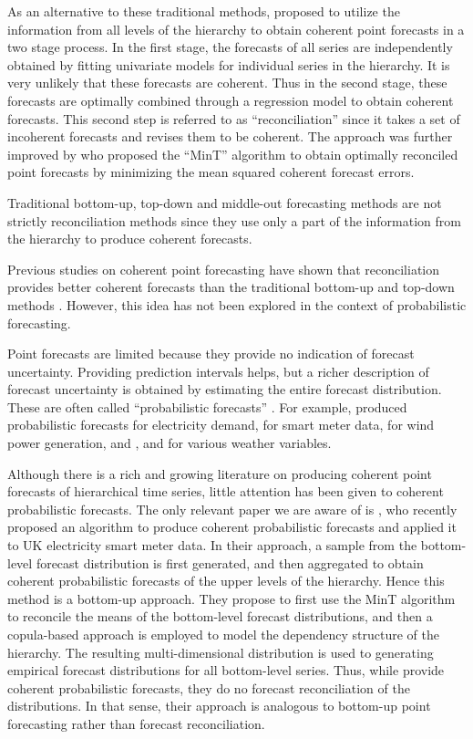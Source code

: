 \documentclass[a4paper, 11pt]{article}
\begin{document}
As an alternative to these traditional methods, \citet{Hyndman2011} proposed to utilize the information from all levels of the hierarchy to obtain coherent point forecasts in  a two stage process. In the first stage, the forecasts of all series are independently obtained by fitting univariate models for individual series in the hierarchy. It is very unlikely that these forecasts are coherent. Thus in the second stage, these forecasts are optimally combined through a regression model to obtain coherent forecasts. This second step is referred to as ``reconciliation'' since it takes a set of incoherent forecasts and revises them to be coherent. The approach was further improved by \citet{Wickramasuriya2017} who proposed the ``MinT'' algorithm to obtain optimally reconciled point forecasts by minimizing the mean squared coherent forecast errors. 

Traditional bottom-up, top-down and middle-out forecasting methods are not strictly reconciliation methods since they use only a part of the information from the hierarchy to produce coherent forecasts. 

Previous studies on coherent point forecasting have shown that reconciliation provides better coherent forecasts than the traditional bottom-up and top-down methods \citep{Hyndman2011,VanErven2015a,Wickramasuriya2017}. However, this idea has not been explored in the context of probabilistic forecasting. 

Point forecasts are limited because they provide no indication of forecast uncertainty. Providing prediction intervals helps, but a richer description of forecast uncertainty is obtained by estimating the entire forecast distribution. These are often called ``probabilistic forecasts'' \citep{Gneiting2014}. For example, \citet{McSharry2005} produced probabilistic forecasts for electricity demand, \citet{BenTaieb2017} for smart meter data, \citet{Pinson2009} for wind power generation, and \citet{Gel2004}, \citet{Gneiting2005a} and \citet{Gneiting2005} for various weather variables.

Although there is a rich and growing literature on producing coherent point forecasts of hierarchical time series, little  attention has been given to coherent probabilistic forecasts. The only relevant paper we are aware of is \citet{BenTaieb2017}, who recently proposed an algorithm to produce coherent probabilistic forecasts and applied it to UK electricity smart meter data. In their approach, a sample from the bottom-level forecast distribution is first generated, and then aggregated to obtain coherent probabilistic forecasts of the upper levels of the hierarchy. Hence this method is a bottom-up approach. They propose to first use the MinT algorithm to reconcile the means of the bottom-level forecast distributions, and then a copula-based approach is employed to model the dependency structure of the hierarchy. The resulting multi-dimensional distribution is used to generating empirical forecast distributions for all bottom-level series. Thus, while \citet{BenTaieb2017} provide coherent probabilistic forecasts, they do no forecast reconciliation of the distributions. In that sense, their approach is analogous to bottom-up point forecasting rather than forecast reconciliation.
\end{document}
